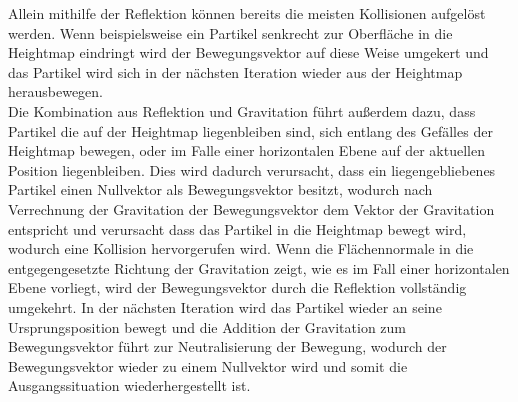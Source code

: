\begin{Spacing}{\mylinespace}
		Allein mithilfe der Reflektion können bereits die meisten Kollisionen
		aufgelöst werden. Wenn beispielsweise ein Partikel senkrecht zur Oberfläche
		in die Heightmap eindringt wird der Bewegungsvektor auf diese Weise umgekert
		und das Partikel wird sich in der nächsten Iteration wieder aus der Heightmap
		herausbewegen.
		\\Die Kombination aus Reflektion und Gravitation führt außerdem dazu, dass
		Partikel die auf der Heightmap liegenbleiben sind, sich entlang des Gefälles
		der Heightmap bewegen, oder im Falle einer horizontalen Ebene auf der aktuellen Position liegenbleiben.
		Dies wird dadurch verursacht, dass ein liegengebliebenes
		Partikel einen Nullvektor als Bewegungsvektor besitzt, wodurch nach Verrechnung der
		Gravitation der Bewegungsvektor dem Vektor der Gravitation entspricht und
		verursacht dass das Partikel in die Heightmap bewegt wird, wodurch eine Kollision hervorgerufen wird.
		Wenn die Flächennormale in die entgegengesetzte Richtung der Gravitation
		zeigt, wie es im Fall einer horizontalen Ebene vorliegt, wird der
		Bewegungsvektor durch die Reflektion vollständig umgekehrt.
		In der nächsten Iteration wird das Partikel wieder an seine
		Ursprungsposition bewegt und die Addition der Gravitation zum Bewegungsvektor führt zur
		Neutralisierung der Bewegung, wodurch der Bewegungsvektor wieder
		zu einem Nullvektor wird und somit die Ausgangssituation wiederhergestellt ist.


\end{Spacing}
